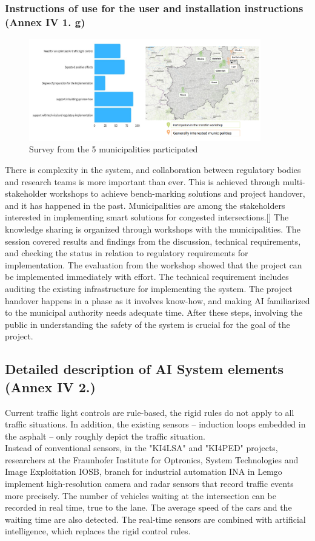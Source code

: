   \subsubsection{Instructions of use for the user and installation instructions (Annex IV 1. g)}
  \begin{figure}[h]
        \centering
        \includegraphics[width=0.9\textwidth]{paper-template/figs/Survey from the users.png}
        \caption{Survey from the 5 municipalities participated}
        \label{fig:my_label}
        \end{figure}
There is complexity in the system, and collaboration between regulatory bodies and research teams is more important than ever. This is achieved through multi-stakeholder workshops to achieve bench-marking solutions and project handover, and it has happened in the past.
Municipalities are among the stakeholders interested in implementing smart solutions for congested intersections.[\citet{KI4LSA_presentation}] The knowledge sharing is organized through workshops with the municipalities. The session covered results and findings from the discussion, technical requirements, and checking the status in relation to regulatory requirements for implementation. The evaluation from the workshop showed that the project can be implemented immediately  with  effort. The technical requirement includes auditing the existing infrastructure for implementing the system. The project handover happens in a phase as it involves know-how, and making AI familiarized to the municipal authority needs adequate time. After these steps, involving the public in understanding the safety of the system is crucial for the goal of the project.
  \subsection{Detailed description of AI System elements (Annex IV 2.)}
  Current traffic light controls are rule-based, the rigid rules do not apply to all traffic situations. In addition, the existing sensors – induction loops embedded in the asphalt – only roughly depict the traffic situation. \\
  Instead of conventional sensors, in the "KI4LSA" and "KI4PED" projects, researchers at the Fraunhofer Institute for Optronics, System Technologies and Image Exploitation IOSB, branch for industrial automation INA in Lemgo implement high-resolution camera and radar sensors that record traffic events more precisely. The number of vehicles waiting at the intersection can be recorded in real time, true to the lane. The average speed of the cars and the waiting time are also detected. The real-time sensors are combined with artificial intelligence, which replaces the rigid control rules.
